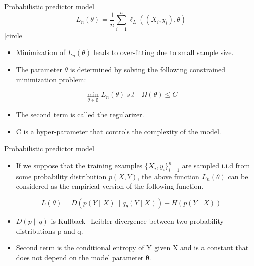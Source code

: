 \documentclass[11pt]{beamer}
\begin{document}
\begin{frame}{Probabilistic predictor model}
\[
L_n\left(\theta\right)=\frac{1}{n}\sum_{i=1}^n\ell_L\left(\left(X_i,y_i\right),\theta\right)
\]
[circle] 
 \begin{itemize}
    \item  Minimization of  $L_n\left(\theta\right)$ leads to over-fitting due to small sample size.

    \item The parameter $\theta$ is determined by solving the following constrained minimization problem: 
               \end{itemize}   
                   
            \[
 \min_{\theta\in\emptyset}L_n\left(\theta\right)\; s.t\quad \Omega\left(\theta\right)\leq C
\]
 \begin{itemize}
    \item The second term  is called the regularizer.
     \item C is a hyper-parameter that controls the complexity of the model.
    \end{itemize}  
\end{frame}
\begin{frame}{Probabilistic predictor model}
 \begin{itemize}
 \item If we suppose that the training examples $\lbrace X_i,y_i\rbrace_{i=1}^n$ are sampled i.i.d from some probability distribution $p(X, Y)$, the above function $L_n(\theta)$ can be considered as the empirical version of the following function.
 \end{itemize}
 
    \[ L\left(\theta\right)=D\left(p\left(Y\mid X\right)\parallel q_\theta\left(Y\mid X\right)\right) + H\left(p\left(Y\mid X\right)\right) \]
   
   \begin{itemize}
\item $D\left(p\| q\right)$ is Kullback$-$Leibler divergence between two probability distributions p and q.
\item Second term is the conditional entropy of Y given X and is a constant that does not depend on the model parameter θ.
    \end{itemize}  
\end{frame}
\end{document}
